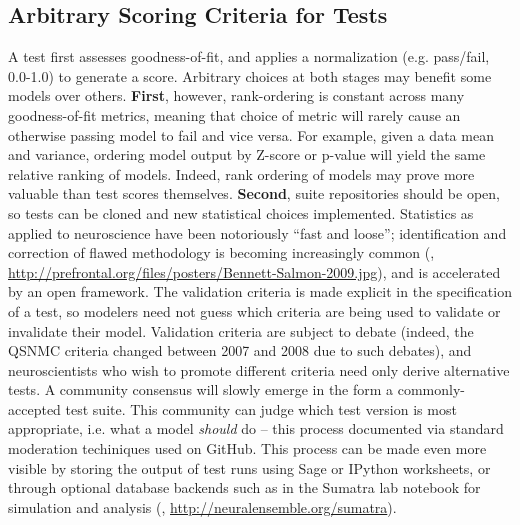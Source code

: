 \documentclass{frontiersSCNS}
\begin{document}
\subsection{Arbitrary Scoring Criteria for Tests}
A test first assesses goodness-of-fit, and applies a normalization (e.g. pass/fail, 0.0-1.0) to generate a score. 
Arbitrary choices at both stages may benefit some models over others.  \textbf{First}, however, rank-ordering is constant across many goodness-of-fit metrics, meaning that choice of metric will rarely cause an otherwise passing model to fail and vice versa. 
For example, given a data mean and variance, ordering model output by Z-score or p-value will yield the same relative ranking of models. 
Indeed, rank ordering of models may prove more valuable than test scores themselves. 
\textbf{Second}, suite repositories should be open, so tests can be cloned and new statistical choices implemented. 
Statistics as applied to neuroscience have been notoriously ``fast and loose''; 
identification and correction of flawed methodology is becoming increasingly common (\cite{button_power_2013,kriegeskorte_circular_2009,galbraith_study_2010}, \url{http://prefrontal.org/files/posters/Bennett-Salmon-2009.jpg}), and is accelerated by an open framework. 
The validation criteria is made explicit in the specification of a test, so modelers need not guess which criteria are being used to validate or invalidate their model. 
Validation criteria are subject to debate (indeed, the QSNMC criteria changed between 2007 and 2008 due to such debates), and neuroscientists who wish to promote different criteria need only derive alternative tests. 
A community consensus will slowly emerge in the form a commonly-accepted test suite. 
This community can judge which test version is most appropriate, i.e. what a model \textit{should} do -- this process documented via standard moderation techiniques used on GitHub.  This process can be made even more visible by storing the output of test runs using Sage or IPython worksheets, or through optional database backends such as in the Sumatra lab notebook for simulation and analysis (\cite{sumatra_davison_2012}, \url{http://neuralensemble.org/sumatra}).  
\end{document}
